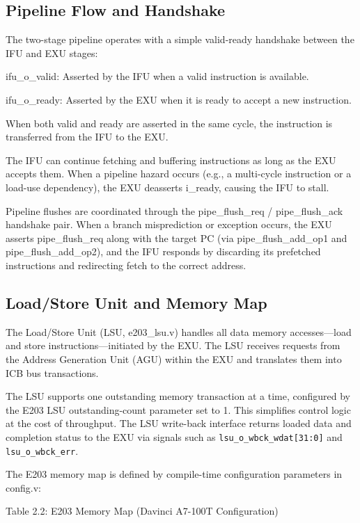 \subsection{Pipeline Flow and Handshake}

The two-stage pipeline operates with a simple valid-ready handshake between the IFU and EXU stages:


ifu\_o\_valid: Asserted by the IFU when a valid instruction is available.


ifu\_o\_ready: Asserted by the EXU when it is ready to accept a new instruction.


When both valid and ready are asserted in the same cycle, the instruction is transferred from the IFU to the EXU.


The IFU can continue fetching and buffering instructions as long as the EXU accepts them. When a pipeline hazard occurs (e.g., a multi-cycle instruction or a load-use dependency), the EXU deasserts i\_ready, causing the IFU to stall.


Pipeline flushes are coordinated through the pipe\_flush\_req / pipe\_flush\_ack handshake pair. When a branch misprediction or exception occurs, the EXU asserts pipe\_flush\_req along with the target PC (via pipe\_flush\_add\_op1 and pipe\_flush\_add\_op2), and the IFU responds by discarding its prefetched instructions and redirecting fetch to the correct address.


\subsection{Load/Store Unit and Memory Map}

The Load/Store Unit (LSU, e203\_lsu.v) handles all data memory accesses—load and store instructions—initiated by the EXU. The LSU receives requests from the Address Generation Unit (AGU) within the EXU and translates them into ICB bus transactions.


The LSU supports one outstanding memory transaction at a time, configured by the E203 LSU outstanding-count parameter set to 1. This simplifies control logic at the cost of throughput. The LSU write-back interface returns loaded data and completion status to the EXU via signals such as \texttt{lsu\_o\_wbck\_\-wdat[31:0]} and \texttt{lsu\_o\_wbck\_\-err}.


The E203 memory map is defined by compile-time configuration parameters in config.v:


Table 2.2: E203 Memory Map (Davinci A7-100T Configuration)


